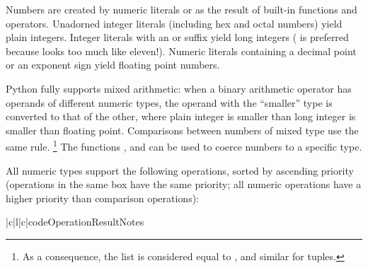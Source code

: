 Numbers are created by numeric literals or as the result of built-in
functions and operators.  Unadorned integer literals (including hex
and octal numbers) yield plain integers.  Integer literals with an 
or  suffix yield long integers
( is preferred because  looks too much like eleven!).
Numeric literals containing a decimal point or an exponent sign yield
floating point numbers.

Python fully supports mixed arithmetic: when a binary arithmetic
operator has operands of different numeric types, the operand with the
``smaller'' type is converted to that of the other, where plain
integer is smaller than long integer is smaller than floating point.
Comparisons between numbers of mixed type use the same rule.%
\footnote{As a consequence, the list \code{[1, 2]} is considered equal
	to \code{[1.0, 2.0]}, and similar for tuples.}
The functions ,  and  can be used
to coerce numbers to a specific type.

All numeric types support the following operations, sorted by
ascending priority (operations in the same box have the same
priority; all numeric operations have a higher priority than
comparison operations):

\begin{tableiii}{|c|l|c|}{code}{Operation}{Result}{Notes}
  \hline
  \hline
  \hline
\end{tableiii}

